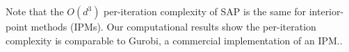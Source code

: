 Note that the $O(d^3)$ per-iteration complexity of SAP is the same
for interior-point methods (IPMs).  Our computational results show the per-iteration
complexity is comparable to Gurobi, a commercial implementation of an IPM..




